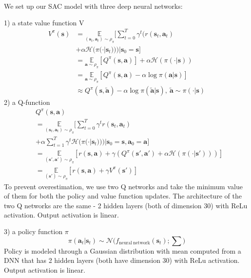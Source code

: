 \documentclass{article}
\begin{document}
We set up our SAC model with three deep neural networks: 

1) a state value function V
\begin{equation*}
\label{eq1}
\begin{split}
V^\pi(\mathbf{s}) & =  \underset{( \mathbf{s}_t, \mathbf{a}_t ) \sim \rho_\pi}{\mathbb{E}} \bigg[ \sum_{t=0}^{T} \gamma^t (r(\mathbf{s}_t,\mathbf{a}_t)\\
& + \alpha \mathcal{H} ( \pi ( \cdot | \mathbf{s}_t) ) ) | \mathbf{s}_0=\mathbf{s} \bigg] \\
& = \underset{\mathbf{a} \sim \rho_\pi}{\mathbb{E}} [ Q^\pi (\mathbf{s},\mathbf{a}) ] + \alpha \mathcal{H} ( \pi( \cdot | \mathbf{s}) ) \\
& = \underset{\mathbf{a} \sim \rho_\pi}{\mathbb{E}} [Q^\pi(\mathbf{s},\mathbf{a}) - \alpha \log \pi ( \mathbf{a} | \mathbf{s}) ]\\
& \approx Q^\pi (\mathbf{s}, \tilde{\mathbf{a}} ) - \alpha \log \pi ( \tilde{\mathbf{a}} | \mathbf{s}),\: \tilde{\mathbf{a}} \sim \pi( \cdot | \mathbf{s})
\end{split}
\end{equation*}
2) a Q-function
\begin{equation*}
\label{eq2}
\begin{split}
& Q^\pi ( \mathbf{s},\mathbf{a} ) \\
& =  \underset{( \mathbf{s}_t, \mathbf{a}_t ) \sim \rho_\pi}{\mathbb{E}} \bigg[ \sum_{t=0}^{T} \gamma^t r (\mathbf{s}_t,\mathbf{a}_t)\\
& + \alpha \sum_{t=1}^{T} \gamma^t \mathcal{H} ( \pi ( \cdot | \mathbf{s}_t) ) ) | \mathbf{s}_0 = \mathbf{s}, \mathbf{a}_0 = \mathbf{a} \bigg] \\
& = \underset{( \mathbf{s}', \mathbf{a}' ) \sim \rho_\pi}{\mathbb{E}} [ r (\mathbf{s},\mathbf{a}) + \gamma ( Q^\pi ( \mathbf{s}', \mathbf{a}' ) + \alpha \mathcal{H} ( \pi ( \cdot | \mathbf{s}' )))] \\
& = \underset{( \mathbf{s}') \sim \rho_\pi}{\mathbb{E}} [ r(\mathbf{s},\mathbf{a}) + \gamma V^\pi (\mathbf{s}') ]
\end{split}
\end{equation*}
To prevent overestimation, we use two Q networks and take the minimum value of them for both the policy and value function updates. The architecture of the two Q networks are the same - 2 hidden layers (both of dimension 30) with ReLu activation. Output activation is linear.

3) a policy function $\pi$
$$\pi ( \mathbf{a}_t | \mathbf{s}_t ) \sim \mathcal{N} \bigg( f_{\mathrm{neural\:network}} ( \mathbf{s}_t); \sum \bigg)$$
Policy is modeled through a Gaussian distribution with mean computed from a DNN that has 2 hidden layers (both have dimension 30) with ReLu activation. Output activation is linear.
\end{document}
